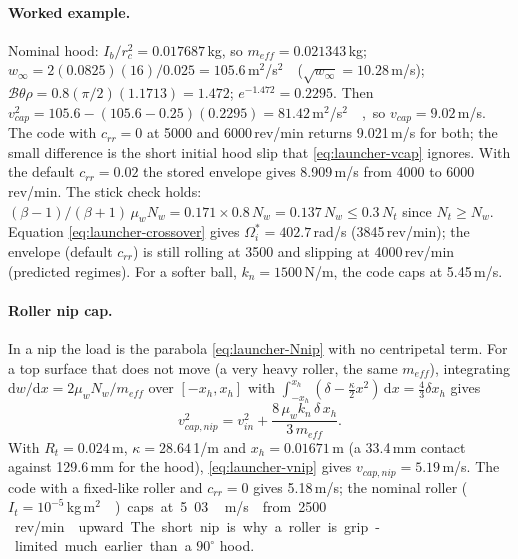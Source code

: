 \paragraph{Worked example.} Nominal hood: $I_b/r_c^2 = 0.017687$\,\unit{kg}\derived, so
$m_{eff} = 0.021343$\,\unit{kg}\derived; $w_\infty = 2(0.0825)(16)/0.025 = 105.6$\,\unit{m$^2$/s$^2$}\derived{}
($\sqrt{w_\infty} = 10.28$\,\unit{m/s}\derived); $\mathcal{B}\theta\rho = 0.8(\pi/2)(1.1713) = 1.472$\derived;
$e^{-1.472} = 0.2295$\derived. Then $v_{cap}^2 = 105.6 - (105.6 - 0.25)(0.2295) = 81.42$\,\unit{m$^2$/s$^2$}\derived, so
$v_{cap} = 9.02$\,\unit{m/s}\derived. The code with $c_{rr} = 0$ at 5000 and 6000\,\unit{rev/min}\assumed{}
returns 9.021\,\unit{m/s}\predicted{} for both; the small difference is the short initial hood slip that
\eqref{eq:launcher-vcap} ignores. With the default $c_{rr} = 0.02$\assumed{} the stored envelope gives
8.909\,\unit{m/s}\predicted{} from 4000\assumed{} to 6000\,\unit{rev/min}\assumed. The stick check holds:
$(\beta-1)/(\beta+1)\,\mu_w N_w = 0.171\times0.8\,N_w = 0.137\,N_w \le 0.3\,N_t$\derived{} since $N_t \ge N_w$.
Equation \eqref{eq:launcher-crossover} gives $\Omega_i^{*} = 402.7$\,\unit{rad/s}\derived{}
(3845\,\unit{rev/min}\derived{}); the envelope (default $c_{rr}$) is still rolling at 3500\assumed{} and slipping at 4000\,\unit{rev/min}\assumed{}
(predicted regimes).
For a softer ball, $k_n = 1500$\,\unit{N/m}\assumed, the code caps at 5.45\,\unit{m/s}\predicted.

\paragraph{Roller nip cap.} In a nip the load is the parabola \eqref{eq:launcher-Nnip} with no centripetal
term. For a top surface that does not move (a very heavy roller, the same $m_{eff}$), integrating
$\mathrm{d}w/\mathrm{d}x = 2\mu_w N_w/m_{eff}$ over $[-x_h, x_h]$ with
$\int_{-x_h}^{x_h}(\delta - \tfrac{\kappa}{2}x^2)\,\mathrm{d}x = \tfrac43\delta x_h$ gives
\begin{equation}
  v_{cap,nip}^2 = v_{in}^2 + \frac{8\,\mu_w k_n\,\delta\,x_h}{3\,m_{eff}} .
  \label{eq:launcher-vnip}
\end{equation}
With $R_t = 0.024$\,\unit{m}\assumed, $\kappa = 28.64$\,\unit{1/m}\derived{} and
$x_h = 0.01671$\,\unit{m}\derived{} (a 33.4\,\unit{mm}\derived{} contact against 129.6\,\unit{mm}\derived{} for the
hood), \eqref{eq:launcher-vnip} gives $v_{cap,nip} = 5.19$\,\unit{m/s}\derived. The code with a fixed-like
roller and $c_{rr} = 0$ gives 5.18\,\unit{m/s}\predicted; the nominal roller ($I_t = 10^{-5}$\,\unit{kg\,m$^2$}\assumed)
caps at 5.03\,\unit{m/s}\predicted{} from 2500\,\unit{rev/min}\predicted{} upward. The short nip is why a roller is
grip-limited much earlier than a $90^\circ$\assumed{} hood.

